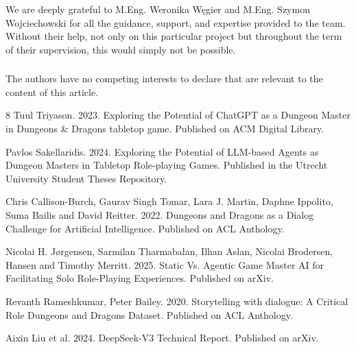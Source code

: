 \documentclass[runningheads]{llncs}
\begin{document}
\begin{credits}
\subsubsection{\ackname} We are deeply grateful to M.Eng. Weronika Węgier and M.Eng. Szymon Wojciechowski for all the guidance, support, and expertise provided to the team. Without their help, not only on this particular project but throughout the term of their supervision, this would simply not be possible.

\subsubsection{\discintname}
The authors have no competing interests to declare that are
relevant to the content of this article.
\end{credits}
%
%
%
% 
% 
%
\begin{thebibliography}{8}
Tuul Triyason. 2023. Exploring the Potential of ChatGPT as a Dungeon Master in Dungeons \& Dragons tabletop game. Published on ACM Digital Library.

Pavlos Sakellaridis. 2024. Exploring the Potential of LLM-based Agents as Dungeon Masters in Tabletop Role-playing Games. Published in the Utrecht University Student Theses Repository.

Chris Callison-Burch, Gaurav Singh Tomar, Lara J. Martin, Daphne Ippolito, Suma Bailis and David Reitter. 2022. Dungeons and Dragons as a Dialog Challenge for Artificial Intelligence. Published on ACL Anthology.

Nicolai H. Jørgensen, Sarmilan Tharmabalan, Ilhan Aslan, Nicolai Brodersen, Hansen and Timothy Merritt. 2025. Static Vs. Agentic Game Master AI for Facilitating Solo Role-Playing Experiences. Published on arXiv.

Revanth Rameshkumar, Peter Bailey. 2020. Storytelling with dialogue: A Critical Role Dungeons and Dragons Dataset. Published on ACL Anthology.

Aixin Liu et al. 2024. DeepSeek-V3 Technical Report. Published on arXiv.

\end{thebibliography}
\end{document}
